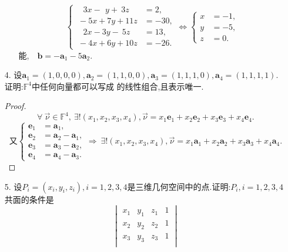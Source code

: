 \documentclass{article}
\begin{document}
\begin{enumerate}
\begin{enumerate}
\[\begin{cases}
                    \ \ \ \,3x-\ \,y+\ 3z&=2,\\
                    \ -5x+7y+11z&=-30,\\
                    \ \ \ \,2x-3y-\ 5z&=13,\\
                    \ -4x+6y+10z&=-26.
                \end{cases}
                \Leftrightarrow
                \begin{cases}
                    x&=-1,\\
                    y&=-5,\\
                    z&=0.
                \end{cases}
            \]
            能,$\quad\boldsymbol{b}=-\boldsymbol{a}_1-5\boldsymbol{a}_2$.
        \end{enumerate}
        \item [4.]设$\boldsymbol{a}_1=(1,0,0,0),\boldsymbol{a}_2=(1,1,0,0),\boldsymbol{a}_3=(1,1,1,0),\boldsymbol{a}_4=(1,1,1,1)$.
        证明:$\mathbb{F}^4$中任何向量都可以写成 的线性组合,且表示唯一.
        \begin{proof}
            \[
            \forall\ \vec{\nu}\in\mathbb{F}^4,\ \exists!(x_1,x_2,x_3,x_4),
            \vec{\nu}=x_1 \boldsymbol{e}_1+x_2 \boldsymbol{e}_2+x_3 \boldsymbol{e}_3+x_4 \boldsymbol{e}_4.
            \]
            \[
                \mbox{又}
                \begin{cases}
                    \boldsymbol{e}_1&=\boldsymbol{a}_1,\\
                    \boldsymbol{e}_2&=\boldsymbol{a}_2-\boldsymbol{a}_1,\\
                    \boldsymbol{e}_3&=\boldsymbol{a}_3-\boldsymbol{a}_2,\\
                    \boldsymbol{e}_4&=\boldsymbol{a}_4-\boldsymbol{a}_3.
                \end{cases}
                \Rightarrow
                \ \exists!(x_1,x_2,x_3,x_4),
                \vec{\nu}=x_1 \boldsymbol{a}_1+x_2 \boldsymbol{a}_2+x_3 \boldsymbol{a}_3+x_4 \boldsymbol{a}_4.
            \]
        \end{proof}
        \item [5.]设$P_i=(x_i,y_i,z_i),i=1,2,3,4$是三维几何空间中的点.证明:$P_i,i=1,2,3,4$共面的条件是
        \[
            \begin{vmatrix}
                x_1 & y_1 & z_1 & 1\\
                x_2 & y_2 & z_2 & 1\\
                x_3 & y_3 & z_3 & 1\\

\end{vmatrix}\]
\end{enumerate}
\end{document}
